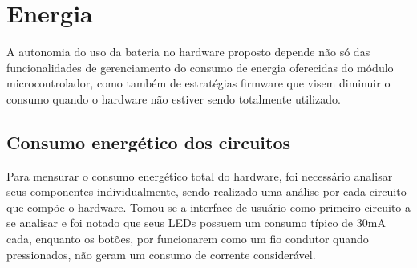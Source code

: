 	\begin{table}[!h]
	\captionsetup{width=10cm}%
	\end{table}


















\section{Energia}\label{sec:energia}

A autonomia do uso da bateria no hardware proposto depende não só das funcionalidades de gerenciamento do consumo de energia oferecidas do módulo microcontrolador, como também de estratégias firmware que visem diminuir o consumo quando o hardware não estiver sendo totalmente utilizado. 

\subsection{Consumo energético dos circuitos}

Para mensurar o consumo energético total do hardware, foi necessário analisar seus componentes individualmente, sendo realizado uma análise por cada circuito que compõe o hardware. Tomou-se a interface de usuário como primeiro circuito a se analisar e foi notado que seus LEDs possuem um consumo típico de 30mA cada, enquanto os botões, por funcionarem como um fio condutor quando pressionados, não geram um consumo de corrente considerável. 


